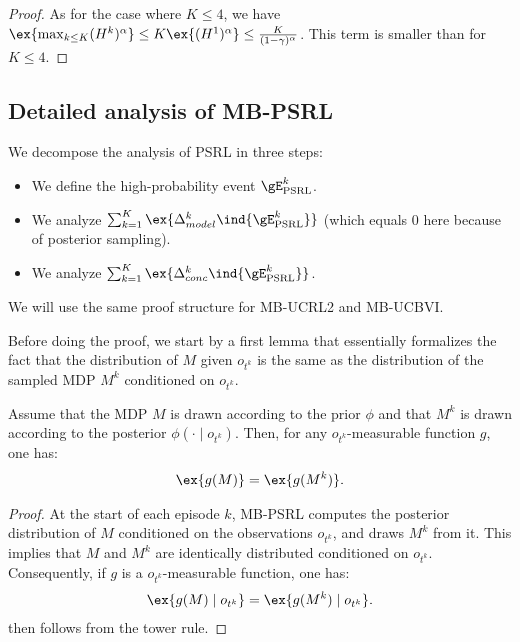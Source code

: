 \begin{subappendices}
\begin{proof}
    As for the case where $K\le4$, we have $\ex{\max_{k\le K}(H^k)^\alpha}\le K\ex{(H^1)^\alpha}\le \frac{K}{(1-\gamma)^{\alpha}}$. This term is smaller than  for $K\le4$.
 \end{proof}


\subsection{Detailed analysis of MB-PSRL}
\label{ssec:proof_PSRL}

We decompose the analysis of PSRL in three steps: 
\begin{itemize}
    \item We define the high-probability event $\gE_\text{PSRL}^{k}$.
    \item We analyze $\sum_{k=1}^K\ex{\Delta_{model}^k \ind{\gE_\text{PSRL}^{k}}}$ (which equals $0$ here because of posterior sampling).
    \item We analyze $\sum_{k=1}^K\ex{\Delta_{conc}^k \ind{\gE_\text{PSRL}^{k}}}$. 
\end{itemize}
We will use the same proof structure for MB-UCRL2 and MB-UCBVI. 

Before doing the proof, we start by a first lemma that essentially formalizes the fact that the distribution of $M$ given $o_{t^k}$ is the same as the distribution of the sampled MDP $M^{k}$ conditioned on $o_{t^k}$. 
\begin{lem}
    \label{lem:bayesian}
    Assume that the MDP $M$ is drawn according to the prior $\phi$ and that $M^k$ is drawn according to the posterior $\phi(\cdot \mid o_{t^k})$. Then, for any $o_{t^k}$-measurable function $g$, one has:
    \begin{align}
        \label{eq:lem_bayesian}
        \ex{g(M)} = \ex{g(M^k)}. 
    \end{align}
\end{lem}
\begin{proof}
    At the start of each episode $k$, MB-PSRL computes the posterior distribution of $M$ conditioned on the observations $o_{t^k}$, and draws $M^k$ from it. This implies that $M$ and $M^k$ are identically distributed conditioned on $o_{t^k}$. Consequently, if $g$ is a $o_{t^k}$-measurable function, one has:
    \begin{align*}
        \ex{g(M) \mid o_{t^k}} = \ex{g(M^k) \mid o_{t^k}}. 
    \end{align*}
     then follows from the tower rule. 
\end{proof}


\end{subappendices}
